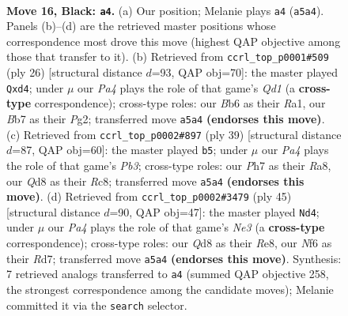 \documentclass[11pt]{article}
\begin{document}
\clearpage

\begin{figure}[p]\centering
\begin{subfigure}{0.46\textwidth}\centering
\resizebox{\linewidth}{!}{%
\newchessgame
\chessboard[
  setfen={r2q4/1bp1k1pp/1b1p1n2/pp2n3/1P2P3/2P5/P1Q2PPP/RNB1RK2 b - - 0 16},
  showmover=false,
  pgfstyle=straightmove, color=movearrow, markmove={a5-a4}
]}
\caption{}
\end{subfigure}\hfill
\begin{subfigure}{0.46\textwidth}\centering
\resizebox{\linewidth}{!}{%
\newchessgame
\chessboard[
  setfen={rn2nrk1/pq2bppp/1p2p3/1B6/3p1B2/P3PN2/1P3PPP/R2QK2R w KQ - 0 14},
  showmover=false,
  pgfstyle=straightmove, color=movearrow, markmove={d1-d4}
]}
\caption{}
\end{subfigure}
\\[4pt]
\begin{subfigure}{0.46\textwidth}\centering
\resizebox{\linewidth}{!}{%
\newchessgame
\chessboard[
  setfen={r1r3k1/pb2qpp1/1p2pn1p/P7/3PP3/3BQNP1/5PP1/R2R2K1 b - - 0 20},
  showmover=false,
  pgfstyle=straightmove, color=movearrow, markmove={b6-b5}
]}
\caption{}
\end{subfigure}\hfill
\begin{subfigure}{0.46\textwidth}\centering
\resizebox{\linewidth}{!}{%
\newchessgame
\chessboard[
  setfen={4r1k1/1p1rqpbp/1Bb1n1p1/4p3/P3P3/1Q1B1P1P/1PR3PK/R4N2 b - - 2 23},
  showmover=false,
  pgfstyle=straightmove, color=movearrow, markmove={e6-d4}
]}
\caption{}
\end{subfigure}
\caption{\textbf{Move 16, Black: \texttt{a4}.} (a) Our position; Melanie plays \texttt{a4} (\texttt{a5a4}). Panels (b)--(d) are the retrieved master positions whose correspondence most drove this move (highest QAP objective among those that transfer to it). (b) Retrieved from \texttt{ccrl\_top\_p0001\#509} (ply 26) [structural distance $d$=93, QAP obj=70]: the master played \texttt{Qxd4}; under $\mu$ our \emph{Pa4} plays the role of that game's \emph{Qd1} (a \textbf{cross-type} correspondence); cross-type roles: our \emph{B}b6 as their \emph{R}a1, our \emph{B}b7 as their \emph{P}g2; transferred move \texttt{a5a4} \textbf{(endorses this move)}. (c) Retrieved from \texttt{ccrl\_top\_p0002\#897} (ply 39) [structural distance $d$=87, QAP obj=60]: the master played \texttt{b5}; under $\mu$ our \emph{Pa4} plays the role of that game's \emph{Pb3}; cross-type roles: our \emph{P}h7 as their \emph{R}a8, our \emph{Q}d8 as their \emph{R}c8; transferred move \texttt{a5a4} \textbf{(endorses this move)}. (d) Retrieved from \texttt{ccrl\_top\_p0002\#3479} (ply 45) [structural distance $d$=90, QAP obj=47]: the master played \texttt{Nd4}; under $\mu$ our \emph{Pa4} plays the role of that game's \emph{Ne3} (a \textbf{cross-type} correspondence); cross-type roles: our \emph{Q}d8 as their \emph{R}e8, our \emph{N}f6 as their \emph{R}d7; transferred move \texttt{a5a4} \textbf{(endorses this move)}. Synthesis: 7 retrieved analogs transferred to \texttt{a4} (summed QAP objective 258, the strongest correspondence among the candidate moves); Melanie committed it via the \texttt{search} selector.}
\label{fig:thought-m31}
\end{figure}
\end{document}
